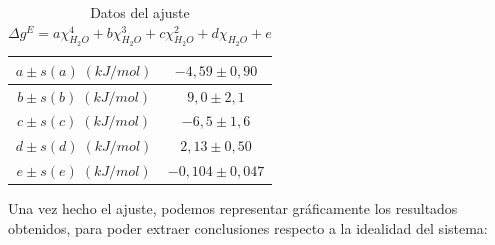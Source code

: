 \documentclass[a4paper,12pt,titlepage]{article}
\begin{document}
\begin{table}[h!]
    \centering
    \begin{tabular}{|c|c|}
    \hline
    $a \pm s(a) \;(kJ/mol)$ &  $-4,59 \pm 0,90$\\ \hline
    $b\pm s(b) \; (kJ/mol)$ & $9,0 \pm 2,1$ \\ \hline
    $c \pm s(c) \; (kJ/mol)$ & $-6,5 \pm 1,6$\\ \hline
    $d \pm s(d) \; (kJ/mol)$ & $2,13 \pm 0,50$ \\ \hline
    $e \pm s(e) \; (kJ/mol)$ & $-0,104 \pm 0,047$ \\ \hline
    \end{tabular}
    \caption{Datos del ajuste $\Delta g^{E} = a\chi_{H_2O}^4 + b\chi_{H_2O}^3 + c\chi_{H_2O}^2 + d\chi_{H_2O} + e$}
    \label{tab:my_label}
\end{table}

Una vez hecho el ajuste, podemos representar gráficamente los resultados obtenidos, para poder extraer conclusiones respecto a la idealidad del sistema:

\newpage
\end{document}
